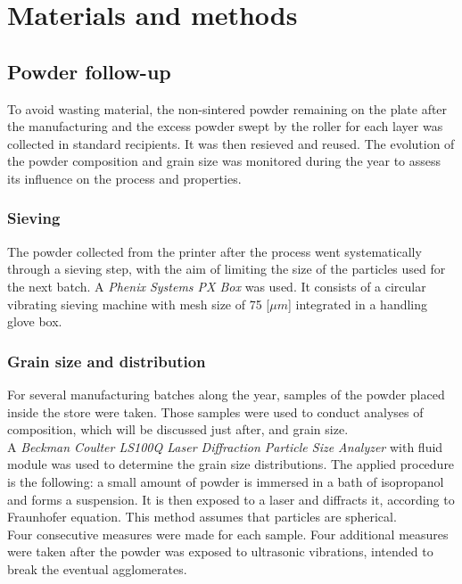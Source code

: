 \chapter{Materials and methods}
\label{Chap3}
\section{Powder follow-up}

To avoid wasting material, the non-sintered powder remaining on the plate after the manufacturing and the excess powder swept by the roller for each layer was collected in standard recipients. It was then resieved and reused. The evolution of the powder composition and grain size was monitored during the year to assess its influence on the process and properties.

\subsection{Sieving}

The powder collected from the printer after the process went systematically through a sieving step, with the aim of limiting the size of the particles used for the next batch. A \textit{Phenix Systems PX Box} was used. It consists of a circular vibrating sieving machine with mesh size of 75 [$\mu m$] integrated in a handling glove box.

\subsection{Grain size and distribution}

For several manufacturing batches along the year, samples of the powder placed inside the store were taken. Those samples were used to conduct analyses of composition, which will be discussed just after, and grain size.\\

A \textit{Beckman Coulter LS100Q Laser Diffraction Particle Size Analyzer} \cite{coulter} with fluid module was used to determine the grain size distributions. The applied procedure is the following: a small amount of powder is immersed in a bath of isopropanol and forms a suspension. It is then exposed to a laser and diffracts it, according to Fraunhofer equation. This method assumes that particles are spherical.\\

Four consecutive measures were made for each sample. Four additional measures were taken after the powder was exposed to ultrasonic vibrations, intended to break the eventual agglomerates.

